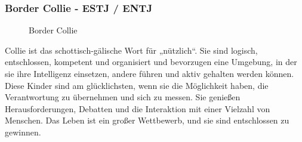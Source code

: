 \subsubsection{Border Collie - ESTJ / ENTJ}
\begin{figure}[H]
	\centering
	\caption[Border Collie]{Border Collie \cite{knowAndLove}}
	\label{img:Border_Collie}
\end{figure}
\glqq\glq Collie\grq{} ist das schottisch-gälische Wort für „nützlich“. Sie sind logisch, entschlossen, kompetent und organisiert und bevorzugen eine Umgebung, in der sie ihre Intelligenz einsetzen, andere führen und aktiv gehalten werden können. Diese Kinder sind am glücklichsten, wenn sie die Möglichkeit haben, die Verantwortung zu übernehmen und sich zu messen. Sie genießen Herausforderungen, Debatten und die Interaktion mit einer Vielzahl von Menschen. Das Leben ist ein großer Wettbewerb, und sie sind entschlossen zu gewinnen.\grqq \cite{knowAndLove}

